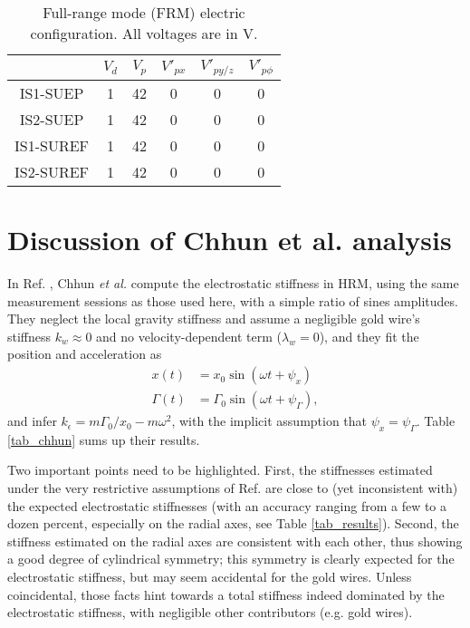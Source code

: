 \documentclass[12pt]{iopart}
\begin{document}
\begin{table}%
\caption{Full-range mode (FRM) electric configuration. All voltages are in V.}
\begin{center}
\begin{tabular}{cccccc}
\hline
& $V_d$ & $V_p$ & $V'_{px}$ & $V'_{py/z}$ & $V'_{p\phi}$ \\
\hline
IS1-SUEP & 1 & 42 & 0 & 0 & 0\\
IS2-SUEP & 1 & 42 & 0 & 0 & 0\\
IS1-SUREF & 1 & 42 & 0 & 0 & 0 \\
IS2-SUREF & 1 & 42 & 0 & 0 & 0\\
\hline
\end{tabular}
\end{center}\label{tab_frm}
\label{default}
\end{table}%



\section{Discussion of Chhun et al. \cite{chhuncqg5} analysis} \label{ssect_chhun}

In Ref. \cite{chhuncqg5}, Chhun {\em et al.} compute the electrostatic stiffness in HRM, using the same measurement sessions as those used here, with a simple ratio of sines amplitudes. They neglect the local gravity stiffness and assume a negligible gold wire's stiffness $k_w\approx0$ and no velocity-dependent term ($\lambda_w=0$), and they fit the position and acceleration as
\begin{align} \label{eq_chhun1}
x(t) & = x_0 \sin(\omega t + \psi_x) \\
\Gamma(t) & = \Gamma_0 \sin(\omega t + \psi_\Gamma),
\end{align}
and infer $k_\epsilon = m \Gamma_0 / x_0 - m\omega^2$, with the implicit assumption that $\psi_x=\psi_\Gamma$. Table \ref{tab_chhun} sums up their results.

Two important points need to be highlighted. First, the stiffnesses estimated under the very restrictive assumptions of Ref. \cite{chhuncqg5} are close to (yet inconsistent with) the expected electrostatic stiffnesses (with an accuracy ranging from a few to a dozen percent, especially on the radial axes, see Table \ref{tab_results}). Second, the stiffness estimated on the radial axes are consistent with each other, thus showing a good degree of cylindrical symmetry; this symmetry is clearly expected for the electrostatic stiffness, but may seem accidental for the gold wires.
Unless coincidental, those facts hint towards a total stiffness indeed dominated by the electrostatic stiffness, with negligible other contributors (e.g. gold wires).
\end{document}

